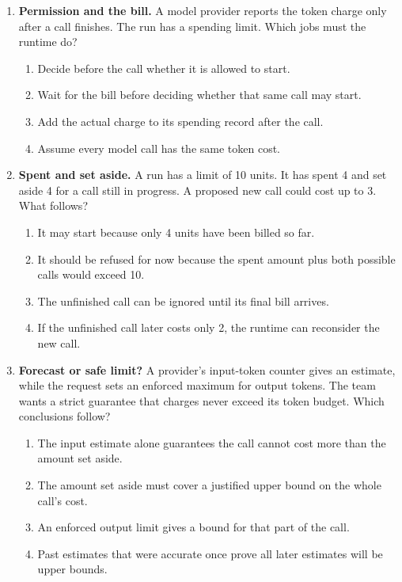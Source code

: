 \begin{enumerate}[start=51,itemsep=0.7\baselineskip]
\item\label{exercise:51} \begin{minipage}[t]{\linewidth}
\textbf{Permission and the bill.} A model provider reports the token charge only after a call finishes. The run has a spending limit. Which jobs must the runtime do?
\begin{enumerate}[label=\textnormal{(\Alph*)},leftmargin=*,itemsep=0pt]
\item Decide before the call whether it is allowed to start.
\item Wait for the bill before deciding whether that same call may start.
\item Add the actual charge to its spending record after the call.
\item Assume every model call has the same token cost.
\end{enumerate}
\end{minipage}

\item\label{exercise:52} \begin{minipage}[t]{\linewidth}
\textbf{Spent and set aside.} A run has a limit of 10 units. It has spent 4 and set aside 4 for a call still in progress. A proposed new call could cost up to 3. What follows?
\begin{enumerate}[label=\textnormal{(\Alph*)},leftmargin=*,itemsep=0pt]
\item It may start because only 4 units have been billed so far.
\item It should be refused for now because the spent amount plus both possible calls would exceed 10.
\item The unfinished call can be ignored until its final bill arrives.
\item If the unfinished call later costs only 2, the runtime can reconsider the new call.
\end{enumerate}
\end{minipage}

\item\label{exercise:53} \begin{minipage}[t]{\linewidth}
\textbf{Forecast or safe limit?} A provider's input-token counter gives an estimate, while the request sets an enforced maximum for output tokens. The team wants a strict guarantee that charges never exceed its token budget. Which conclusions follow?
\begin{enumerate}[label=\textnormal{(\Alph*)},leftmargin=*,itemsep=0pt]
\item The input estimate alone guarantees the call cannot cost more than the amount set aside.
\item The amount set aside must cover a justified upper bound on the whole call's cost.
\item An enforced output limit gives a bound for that part of the call.
\item Past estimates that were accurate once prove all later estimates will be upper bounds.
\end{enumerate}
\end{minipage}


\end{enumerate}
